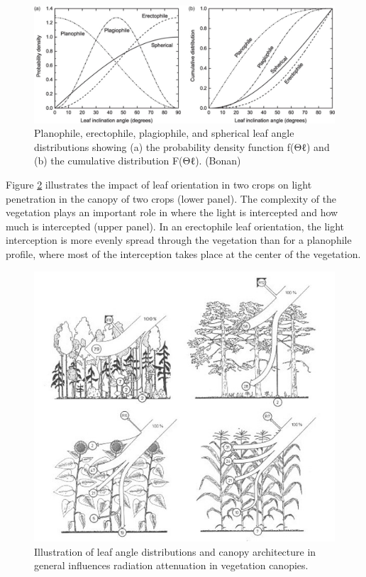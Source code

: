 \documentclass[
  12pt,
  oneside]{book}
\begin{document}
\begin{figure}

{\centering \includegraphics[width=0.8\linewidth]{figures/chap3/f34_angle_distr} 

}

\caption{Planophile, erectophile, plagiophile, and spherical leaf angle distributions showing (a) the probability density function f(Θℓ) and (b) the cumulative distribution F(Θℓ). (Bonan)}\label{fig:f34}
\end{figure}

Figure \ref{fig:f35} illustrates the impact of leaf orientation in two crops on light penetration in the canopy of two crops (lower panel). The complexity of the vegetation plays an important role in where the light is intercepted and how much is intercepted (upper panel). In an erectophile leaf orientation, the light interception is more evenly spread through the vegetation than for a planophile profile, where most of the interception takes place at the center of the vegetation.

\begin{figure}

{\centering \includegraphics[width=0.8\linewidth]{figures/chap3/f35_architecture} 

}

\caption{Illustration of leaf angle distributions and canopy architecture in general influences radiation attenuation in vegetation canopies.}\label{fig:f35}
\end{figure}
\end{document}
